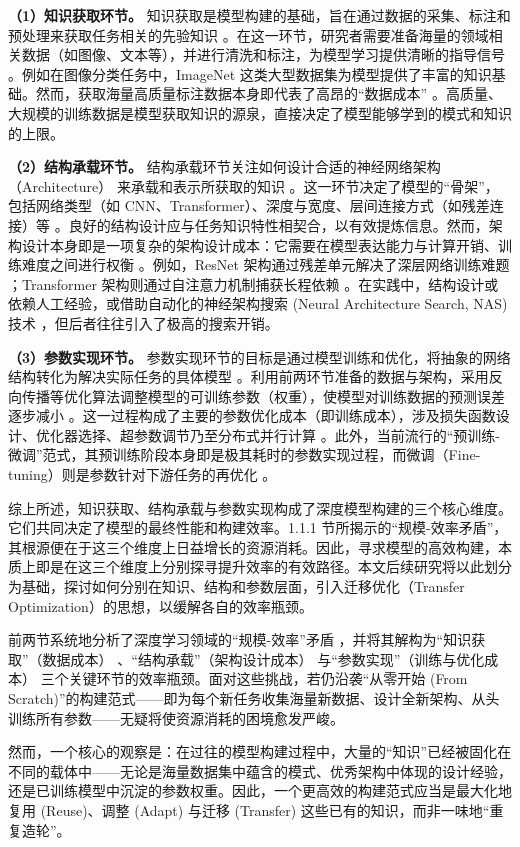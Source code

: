 \documentclass[../main.tex]{subfiles}
\begin{document}
\textbf{（1）知识获取环节。}
知识获取是模型构建的基础，旨在通过数据的采集、标注和预处理来获取任务相关的先验知识 。在这一环节，研究者需要准备海量的领域相关数据（如图像、文本等），并进行清洗和标注，为模型学习提供清晰的指导信号 。例如在图像分类任务中，ImageNet 这类大型数据集为模型提供了丰富的知识基础。然而，获取海量高质量标注数据本身即代表了高昂的“数据成本” 。高质量、大规模的训练数据是模型获取知识的源泉，直接决定了模型能够学到的模式和知识的上限。

\textbf{（2）结构承载环节。}
结构承载环节关注如何设计合适的神经网络架构（Architecture） 来承载和表示所获取的知识 。这一环节决定了模型的“骨架”，包括网络类型（如 CNN、Transformer）、深度与宽度、层间连接方式（如残差连接）等 。良好的结构设计应与任务知识特性相契合，以有效提炼信息。然而，架构设计本身即是一项复杂的架构设计成本：它需要在模型表达能力与计算开销、训练难度之间进行权衡 。例如，ResNet 架构通过残差单元解决了深层网络训练难题 ；Transformer 架构则通过自注意力机制捕获长程依赖 。在实践中，结构设计或依赖人工经验，或借助自动化的神经架构搜索 (Neural Architecture Search, NAS) 技术 ，但后者往往引入了极高的搜索开销。

\textbf{（3）参数实现环节。}
参数实现环节的目标是通过模型训练和优化，将抽象的网络结构转化为解决实际任务的具体模型 。利用前两环节准备的数据与架构，采用反向传播等优化算法调整模型的可训练参数（权重），使模型对训练数据的预测误差逐步减小 。这一过程构成了主要的参数优化成本（即训练成本），涉及损失函数设计、优化器选择、超参数调节乃至分布式并行计算 。此外，当前流行的“预训练-微调”范式，其预训练阶段本身即是极其耗时的参数实现过程，而微调（Fine-tuning）则是参数针对下游任务的再优化 。

综上所述，知识获取、结构承载与参数实现构成了深度模型构建的三个核心维度。它们共同决定了模型的最终性能和构建效率。1.1.1 节所揭示的“规模-效率矛盾”，其根源便在于这三个维度上日益增长的资源消耗。因此，寻求模型的高效构建，本质上即是在这三个维度上分别探寻提升效率的有效路径。本文后续研究将以此划分为基础，探讨如何分别在知识、结构和参数层面，引入迁移优化（Transfer Optimization）的思想，以缓解各自的效率瓶颈。


前两节系统地分析了深度学习领域的“规模-效率”矛盾 ，并将其解构为“知识获取”（数据成本） 、“结构承载”（架构设计成本） 与“参数实现”（训练与优化成本）  三个关键环节的效率瓶颈。面对这些挑战，若仍沿袭“从零开始 (From Scratch)”的构建范式——即为每个新任务收集海量新数据、设计全新架构、从头训练所有参数——无疑将使资源消耗的困境愈发严峻。

然而，一个核心的观察是：在过往的模型构建过程中，大量的“知识”已经被固化在不同的载体中——无论是海量数据集中蕴含的模式、优秀架构中体现的设计经验，还是已训练模型中沉淀的参数权重。因此，一个更高效的构建范式应当是最大化地复用 (Reuse)、调整 (Adapt) 与迁移 (Transfer) 这些已有的知识，而非一味地“重复造轮”。
\end{document}
